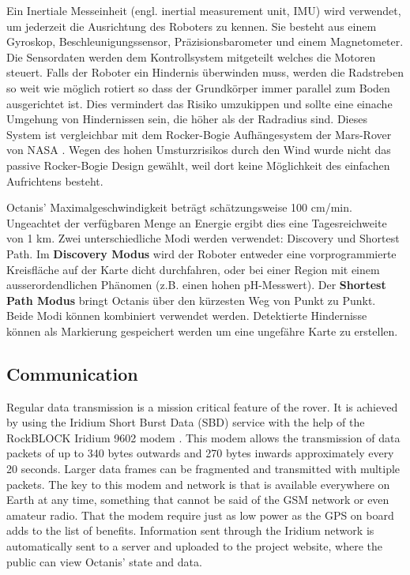 \documentclass[a4paper,12pt]{article}
\begin{document}
Ein Inertiale Messeinheit (engl. inertial measurement unit, IMU) wird verwendet, um jederzeit die Ausrichtung des Roboters zu kennen. Sie besteht aus einem Gyroskop, Beschleunigungssensor, Präzisionsbarometer und einem Magnetometer. Die Sensordaten werden dem Kontrollsystem mitgeteilt welches die Motoren steuert. Falls der Roboter ein Hindernis überwinden muss, werden die Radstreben so weit wie möglich rotiert so dass der Grundkörper immer parallel zum Boden ausgerichtet ist. Dies vermindert das Risiko umzukippen und sollte eine einache Umgehung von Hindernissen sein, die höher als der Radradius sind. Dieses System ist vergleichbar mit dem Rocker-Bogie Aufhängesystem der Mars-Rover von NASA \cite{rockerbogie}. Wegen des hohen Umsturzrisikos durch den Wind wurde nicht das passive Rocker-Bogie Design gewählt, weil dort keine Möglichkeit des einfachen Aufrichtens besteht.

Octanis' Maximalgeschwindigkeit beträgt schätzungsweise 100 cm/min. Ungeachtet der verfügbaren Menge an Energie ergibt dies eine Tagesreichweite von 1 km. Zwei unterschiedliche Modi werden verwendet: Discovery und Shortest Path. Im \textbf{Discovery Modus} wird der Roboter entweder eine vorprogrammierte Kreisfläche auf der Karte dicht durchfahren, oder bei einer Region mit einem ausserordendlichen Phänomen (z.B. einen hohen pH-Messwert). Der \textbf{Shortest Path Modus} bringt Octanis über den kürzesten Weg von Punkt zu Punkt. Beide Modi können kombiniert verwendet werden. Detektierte Hindernisse können als Markierung gespeichert werden um eine ungefähre Karte zu erstellen.


\subsection{Communication}

Regular data transmission is a mission critical feature of the rover. It is achieved by using the Iridium Short Burst Data (SBD) service with the help of the RockBLOCK Iridium 9602 modem \cite{iridium}. This modem allows the transmission of data packets of up to 340 bytes outwards and 270 bytes inwards approximately every 20 seconds. Larger data frames can be fragmented and transmitted with multiple packets. The key to this modem and network is that is available everywhere on Earth at any time, something that cannot be said of the GSM network or even amateur radio. That the modem require just as low power as the GPS on board adds to the list of benefits. Information sent through the Iridium network is automatically sent to a server and uploaded to the project website, where the public can view Octanis' state and data.
\end{document}
